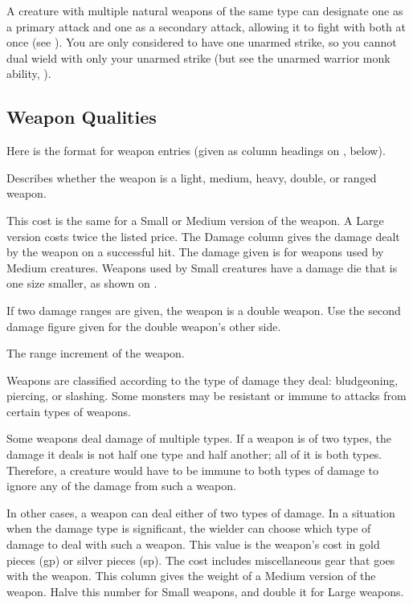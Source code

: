 A creature with multiple natural weapons of the same type can designate one as a primary attack and one as a secondary attack, allowing it to fight with both at once (see ). You are only considered to have one unarmed strike, so you cannot dual wield with only your unarmed strike (but see the unarmed warrior monk ability, ).

\subsection{Weapon Qualities}
Here is the format for weapon entries (given as column headings on , below).

 Describes whether the weapon is a light, medium, heavy, double, or ranged weapon.

\par This cost is the same for a Small or Medium version of the weapon. A Large version costs twice the listed price.
 The Damage column gives the damage dealt by the weapon on a successful hit. The damage given is for weapons used by Medium creatures. Weapons used by Small creatures have a damage die that is one size smaller, as shown on .

If two damage ranges are given, the weapon is a double weapon. Use the second damage figure given for the double weapon's other side.

 The range increment of the weapon.

 Weapons are classified according to the type of damage they deal: bludgeoning, piercing, or slashing. Some monsters may be resistant or immune to attacks from certain types of weapons.

Some weapons deal damage of multiple types. If a weapon is of two types, the damage it deals is not half one type and half another; all of it is both types. Therefore, a creature would have to be immune to both types of damage to ignore any of the damage from such a weapon.

In other cases, a weapon can deal either of two types of damage. In a situation when the damage type is significant, the wielder can choose which type of damage to deal with such a weapon.
 This value is the weapon's cost in gold pieces (gp) or silver pieces (sp). The cost includes miscellaneous gear that goes with the weapon.
 This column gives the weight of a Medium version of
the weapon. Halve this number for Small weapons, and double it for
Large weapons.

